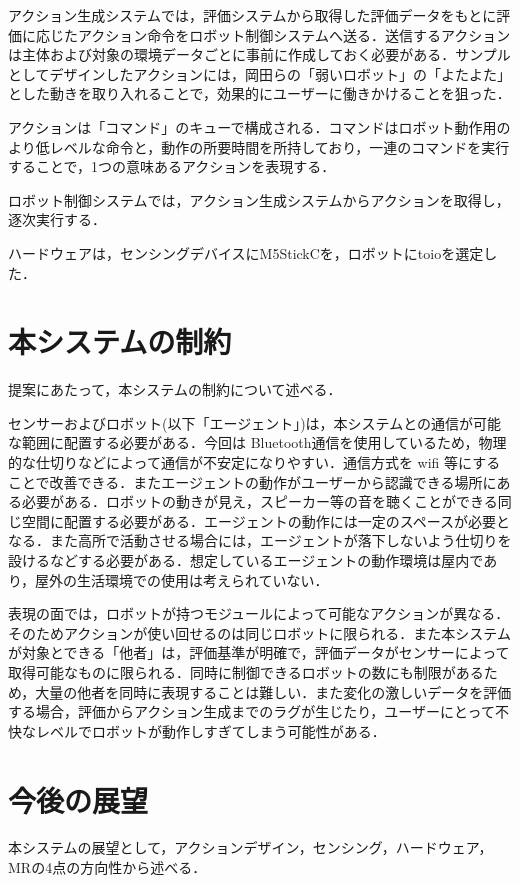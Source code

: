 \documentclass[paper=a4paper,jafontsize=9pt,head_space=15mm,gutter=20mm,
twocolumn,number_of_lines=49, line_length=26zw]{myuarticle}
\begin{document}
アクション生成システムでは，評価システムから取得した評価データをもとに評価に応じたアクション命令をロボット制御システムへ送る．送信するアクションは主体および対象の環境データごとに事前に作成しておく必要がある．サンプルとしてデザインしたアクションには，岡田ら\cite{岡田-2017-弱いロボ}の「弱いロボット」の「よたよた」とした動きを取り入れることで，効果的にユーザーに働きかけることを狙った．

アクションは「コマンド」のキューで構成される．コマンドはロボット動作用のより低レベルな命令と，動作の所要時間を所持しており，一連のコマンドを実行することで，1つの意味あるアクションを表現する．

ロボット制御システムでは，アクション生成システムからアクションを取得し，逐次実行する．

ハードウェアは，センシングデバイスにM5StickCを，ロボットにtoioを選定した．

\section{本システムの制約}

提案にあたって，本システムの制約について述べる．

センサーおよびロボット(以下「エージェント」)は，本システムとの通信が可能な範囲に配置する必要がある．今回は Bluetooth通信を使用しているため，物理的な仕切りなどによって通信が不安定になりやすい．通信方式を wifi 等にすることで改善できる．またエージェントの動作がユーザーから認識できる場所にある必要がある．ロボットの動きが見え，スピーカー等の音を聴くことができる同じ空間に配置する必要がある．エージェントの動作には一定のスペースが必要となる．また高所で活動させる場合には，エージェントが落下しないよう仕切りを設けるなどする必要がある．想定しているエージェントの動作環境は屋内であり，屋外の生活環境での使用は考えられていない．

表現の面では，ロボットが持つモジュールによって可能なアクションが異なる．そのためアクションが使い回せるのは同じロボットに限られる．また本システムが対象とできる「他者」は，評価基準が明確で，評価データがセンサーによって取得可能なものに限られる．同時に制御できるロボットの数にも制限があるため，大量の他者を同時に表現することは難しい．また変化の激しいデータを評価する場合，評価からアクション生成までのラグが生じたり，ユーザーにとって不快なレベルでロボットが動作しすぎてしまう可能性がある．

\section{今後の展望}
本システムの展望として，アクションデザイン，センシング，ハードウェア，MRの4点の方向性から述べる．
\end{document}
